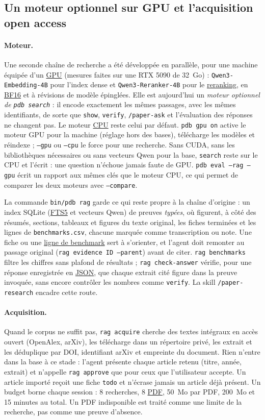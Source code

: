 \documentclass[11pt,a4paper]{article}
\newcommand{\cmd}[1]{\texttt{#1}}
\newcommand{\gl}[2]{\hyperlink{gl:#1}{\textcolor{glcolor}{#2}}}
\begin{document}
\subsection{Un moteur optionnel sur GPU et l'acquisition open access}
\label{sec:qwen}

\paragraph{Moteur.} Une seconde chaîne de recherche a été développée en parallèle, pour une
machine équipée d'un \gl{GPU}{GPU} (mesures faites sur une RTX 5090 de 32~Go) : \cmd{Qwen3-Embedding-4B}
pour l'index dense et \cmd{Qwen3-Reranker-4B} pour le \gl{reranking}{reranking}, en \gl{BF16}{BF16} et à révisions de
modèle épinglées. Elle est aujourd'hui un \emph{moteur optionnel de \cmd{pdb search}} : il
encode exactement les mêmes passages, avec les mêmes identifiants, de sorte que \cmd{show},
\cmd{verify}, \cmd{/paper-ask} et l'évaluation des réponses ne changent pas. Le moteur
\gl{CPU}{CPU} reste celui par défaut. \cmd{pdb gpu on} active le moteur GPU pour la machine (réglage
hors des bases), télécharge les modèles et réindexe ; \cmd{--gpu} ou \cmd{--cpu} le force
pour une recherche. Sans CUDA, sans les bibliothèques nécessaires ou sans vecteurs Qwen
pour la base, \cmd{search} reste sur le CPU et l'écrit : une question n'échoue jamais faute
de GPU. \cmd{pdb eval --rag --gpu} écrit un rapport aux mêmes clés que le moteur CPU, ce qui
permet de comparer les deux moteurs avec \cmd{--compare}.

La commande \cmd{bin/pdb rag} garde ce qui reste propre à la chaîne d'origine : un index
SQLite (\gl{FTS5}{FTS5} et vecteurs Qwen) de preuves \emph{typées}, où figurent, à côté des résumés,
sections, tableaux et figures du texte original, les fiches terminées et les lignes de
\cmd{benchmarks.csv}, chacune marquée comme transcription ou note. Une fiche ou une
\gl{benchmark}{ligne de benchmark} sert à s'orienter, et l'agent doit remonter au passage original
(\cmd{rag evidence ID --parent}) avant de citer. \cmd{rag benchmarks} filtre les chiffres sans
plafond de résultats ; \cmd{rag check-answer} vérifie, pour une réponse enregistrée en
\gl{JSON}{JSON}, que chaque extrait cité figure dans la preuve invoquée, sans encore contrôler les
nombres comme \cmd{verify}. La skill \cmd{/paper-research} encadre cette route.

\paragraph{Acquisition.} Quand le corpus ne suffit pas, \cmd{rag acquire} cherche des textes
intégraux en accès ouvert (OpenAlex, arXiv), les télécharge dans un répertoire privé,
les extrait et les déduplique par DOI, identifiant arXiv et empreinte du document. Rien
n'entre dans la base à ce stade : l'agent présente chaque article retenu (titre, année,
extrait) et n'appelle \cmd{rag approve} que pour ceux que l'utilisateur accepte. Un article
importé reçoit une fiche \cmd{todo} et n'écrase jamais un article déjà présent. Un budget
borne chaque session : 8 recherches, 8 \gl{PDF}{PDF}, 50~Mo par PDF, 200~Mo et 15 minutes au total.
Un PDF indisponible est traité comme une limite de la recherche, pas comme une preuve
d'absence.
\end{document}
